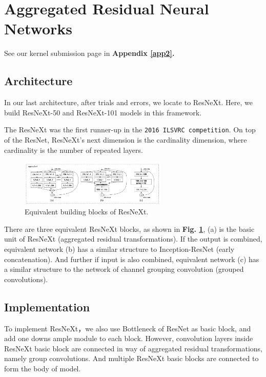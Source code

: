 \documentclass[10pt,twocolumn,letterpaper]{article}
\begin{document}

\section{Aggregated Residual Neural Networks} \label{SECresX}

See our kernel submission page in \textbf{Appendix \ref{app2}.}

\subsection{Architecture}

In our last architecture, after trials and errors, we locate to \textsf{ResNeXt}. Here, we build \textsf{ResNeXt-50} and \textsf{ResNeXt-101} models in this framework.

The \textsf{ResNeXt} was the first runner-up in the \texttt{2016 ILSVRC competition}. On top of the \textsf{ResNet}, \textsf{ResNeXt}'s next dimension is the cardinality dimension, where cardinality is the number of repeated layers.

\begin{figure}[h]
\centering
\includegraphics[width=7cm]{resnextblock.png}
\caption{Equivalent building blocks of \textsf{ResNeXt}.}
\label{resxblock}
\end{figure}

There are three equivalent \textsf{ResNeXt} blocks, as shown in \textbf{Fig. \ref{resxblock}}, (a) is the basic unit of \textsf{ResNeXt} (aggregated residual transformations). If the output is combined, equivalent network (b) has a similar structure to Inception-\textsf{ResNet} (early concatenation). And further if input is also combined, equivalent network (c) has a similar structure to the network of channel grouping convolution (grouped convolutions).

\subsection{Implementation}

To implement \textsf{ResNeXt}，we also use Bottleneck of \textsf{ResNet} as basic block, and add one downs ample module to each block. However, convolution layers inside \textsf{ResNeXt} basic block are connected in way of aggregated residual transformations, namely group convolutions. And multiple \textsf{ResNeXt} basic blocks are connected to form the body of model.
\end{document}
